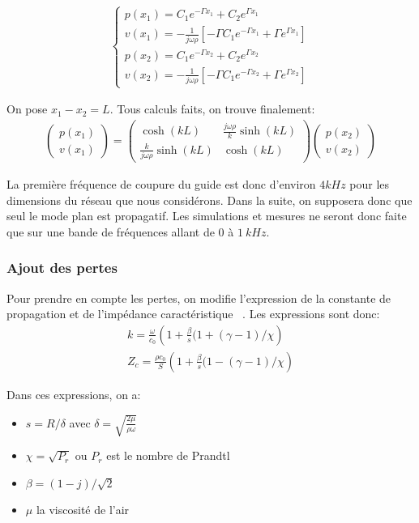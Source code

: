 \begin{eqnarray*}
\begin{cases}
p(x_1)  =  C_1 e^{-\Gamma x_1} + C_2 e^{\Gamma x_1} \\
v(x_1)  =  -\frac{1}{j\omega\rho} [ -\Gamma C_1 e^{-\Gamma x_1} + \Gamma e^{\Gamma x_1}]\\
p(x_2)  =  C_1 e^{-\Gamma x_2} + C_2 e^{\Gamma x_2} \\
v(x_2)  =  -\frac{1}{j\omega\rho} [ -\Gamma C_1 e^{-\Gamma x_2} + \Gamma e^{\Gamma x_2}]
\end{cases}
\end{eqnarray*}
 
On pose $x_1 - x_2 = L$. Tous calculs faits, on trouve finalement:
\begin{eqnarray*}
\begin{pmatrix} p(x_1) \\ v(x_1) \end{pmatrix} = \begin{pmatrix} \cosh(kL) & \frac{j\omega\rho}{k} \sinh(k L) \\  \frac{k}{j\omega\rho}\sinh(k L) & \cosh(k L) \end{pmatrix} \begin{pmatrix} p(x_2) \\ v(x_2) \end{pmatrix}
\end{eqnarray*}

La première fréquence de coupure du guide est donc d'environ $4kHz$ pour les dimensions du réseau que nous considérons. Dans la suite, on supposera donc que seul le mode plan est propagatif. Les simulations et mesures ne seront donc faite que sur une bande de fréquences allant de $0$ à $1~kHz$.

\subsubsection{Ajout des pertes}

Pour prendre en compte les pertes, on modifie l'expression de la constante de propagation et de l'impédance caractéristique ~\cite{slow}. Les expressions sont donc:
\begin{eqnarray*}
 k =  \frac{\omega}{c_0} \left( 1 + \frac{\beta}{s}(1+(\gamma-1)/ \chi \right) \\
 Z_c =  \frac{\rho c_0}{S} \left( 1 + \frac{\beta}{s}(1-(\gamma-1)/ \chi \right) 
\end{eqnarray*}

Dans ces expressions, on a:
\begin{itemize}
 \item  $s=R/ \delta$ avec $\delta = \sqrt{\frac{2 \mu}{\rho \omega}}$
 \item  $\chi = \sqrt{P_r}$ ou $P_r$ est le nombre de Prandtl
 \item $\beta = (1-j)/\sqrt{2}$ 
 \item $\mu$ la viscosité de l'air
\end{itemize}

